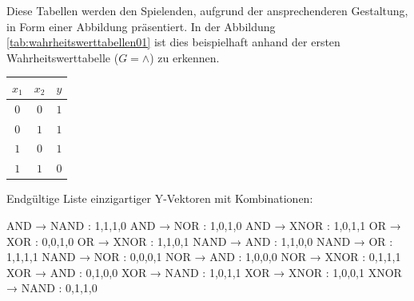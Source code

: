 Diese Tabellen werden den Spielenden, aufgrund der ansprechenderen Gestaltung, in Form einer Abbildung präsentiert.
In der Abbildung \ref{tab:wahrheitswerttabellen01} ist dies beispielhaft anhand der ersten Wahrheitswerttabelle ($G = \land$) zu erkennen.

\begin{tabular}{|c|c|c|} 
    \hline
    $x_1$ & $x_2$ & $y$ \\
    \hline\hline
    $0$ & $0$ & $1$ \\
    $0$ & $1$ & $1$ \\
    $1$ & $0$ & $1$ \\
    $1$ & $1$ & $0$ \\
    \hline
\end{tabular}

Endgültige Liste einzigartiger Y-Vektoren mit Kombinationen:

    AND → NAND : 1,1,1,0
    AND → NOR : 1,0,1,0
    AND → XNOR : 1,0,1,1
    OR → XOR : 0,0,1,0
    OR → XNOR : 1,1,0,1
    NAND → AND : 1,1,0,0
    NAND → OR : 1,1,1,1
    NAND → NOR : 0,0,0,1
    NOR → AND : 1,0,0,0
    NOR → XNOR : 0,1,1,1
    XOR → AND : 0,1,0,0
    XOR → NAND : 1,0,1,1
    XOR → XNOR : 1,0,0,1
    XNOR → NAND : 0,1,1,0
